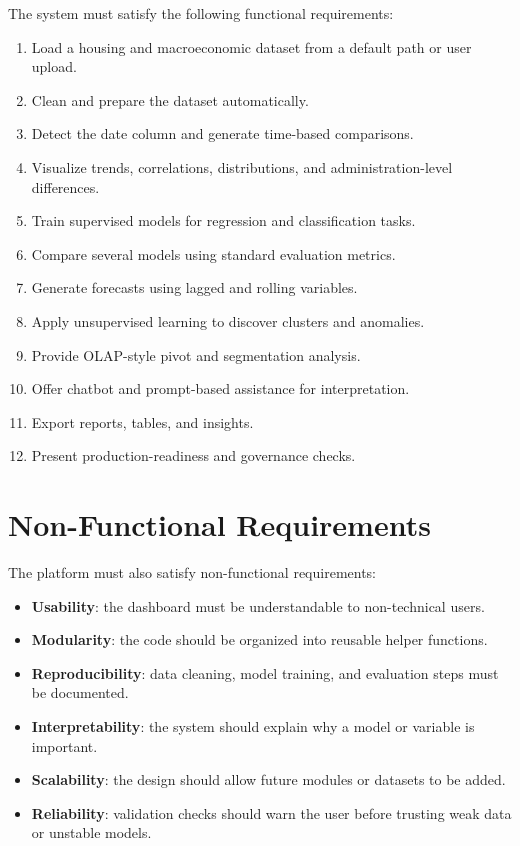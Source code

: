 The system must satisfy the following functional requirements:
\begin{enumerate}
\item Load a housing and macroeconomic dataset from a default path or user upload.
\item Clean and prepare the dataset automatically.
\item Detect the date column and generate time-based comparisons.
\item Visualize trends, correlations, distributions, and administration-level differences.
\item Train supervised models for regression and classification tasks.
\item Compare several models using standard evaluation metrics.
\item Generate forecasts using lagged and rolling variables.
\item Apply unsupervised learning to discover clusters and anomalies.
\item Provide OLAP-style pivot and segmentation analysis.
\item Offer chatbot and prompt-based assistance for interpretation.
\item Export reports, tables, and insights.
\item Present production-readiness and governance checks.
\end{enumerate}

\section{Non-Functional Requirements}

The platform must also satisfy non-functional requirements:
\begin{itemize}
\item \textbf{Usability}: the dashboard must be understandable to non-technical users.
\item \textbf{Modularity}: the code should be organized into reusable helper functions.
\item \textbf{Reproducibility}: data cleaning, model training, and evaluation steps must be documented.
\item \textbf{Interpretability}: the system should explain why a model or variable is important.
\item \textbf{Scalability}: the design should allow future modules or datasets to be added.
\item \textbf{Reliability}: validation checks should warn the user before trusting weak data or unstable models.
\end{itemize}

